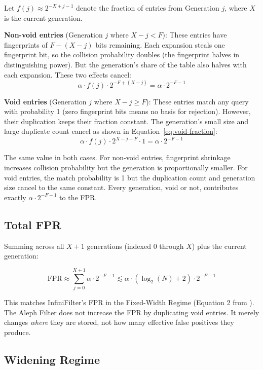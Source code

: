 Let $f(j) \approx 2^{-X+j-1}$ denote the fraction of entries from 
Generation $j$, where $X$ is the current generation.

\textbf{Non-void entries} (Generation $j$ where $X - j < F$): These 
entries have fingerprints of $F - (X - j)$ bits remaining. Each 
expansion steals one fingerprint bit, so the collision probability 
doubles (the fingerprint halves in distinguishing power). But the 
generation's share of the table also halves with each expansion. 
These two effects cancel:
\[
  \alpha \cdot f(j) \cdot 2^{-F+(X-j)} = \alpha \cdot 2^{-F-1}
\]

\textbf{Void entries} (Generation $j$ where $X - j \geq F$): These 
entries match any query with probability 1 (zero fingerprint bits 
means no basis for rejection). However, their duplication keeps 
their fraction constant. The generation's small size and large 
duplicate count cancel as shown in 
Equation~\ref{eq:void-fraction}:
\[
  \alpha \cdot f(j) \cdot 2^{X-j-F} \cdot 1 = \alpha \cdot 2^{-F-1}
\]

The same value in both cases. For non-void entries, fingerprint 
shrinkage increases collision probability but the generation is 
proportionally smaller. For void entries, the match probability is 1 
but the duplication count and generation size cancel to the same 
constant. Every generation, void or not, contributes exactly 
$\alpha \cdot 2^{-F-1}$ to the FPR.

\subsection{Total FPR}

Summing across all $X + 1$ generations (indexed $0$ through $X$) 
plus the current generation:

\begin{equation}
  \text{FPR} \approx \sum_{j=0}^{X+1} \alpha \cdot 2^{-F-1} 
  \lesssim \alpha \cdot (\log_2(N) + 2) \cdot 2^{-F-1}
  \label{eq:aleph-fpr-fixed}
\end{equation}

This matches InfiniFilter's FPR in the Fixed-Width Regime 
(Equation 2 from \cite{aleph}). The Aleph Filter does not increase 
the FPR by duplicating void entries. It merely changes \emph{where} 
they are stored, not how many effective false positives they produce.

\subsection{Widening Regime}

